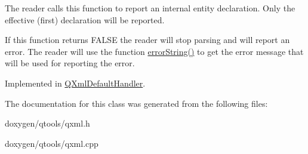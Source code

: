 The reader calls this function to report an internal entity declaration. Only the effective (first) declaration will be reported.

If this function returns F\+A\+L\+SE the reader will stop parsing and will report an error. The reader will use the function \mbox{\hyperlink{class_q_xml_decl_handler_a92d52f5e57b8041a956c30b92dd28161}{error\+String()}} to get the error message that will be used for reporting the error. 

Implemented in \mbox{\hyperlink{class_q_xml_default_handler_a3bb2a9a06a78ec957e3fed5a909a8e1c}{Q\+Xml\+Default\+Handler}}.



The documentation for this class was generated from the following files\+:\begin{DoxyCompactItemize}
\item 
doxygen/qtools/qxml.\+h\item 
doxygen/qtools/qxml.\+cpp\end{DoxyCompactItemize}
